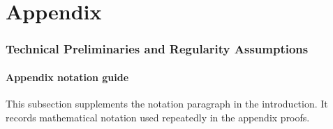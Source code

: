 \documentclass{article}
\theoremstyle{normaltheorem}
\begin{document}
\part{Appendix}
\endgroup
\parttoc

\clearpage

\section{Technical Preliminaries and Regularity Assumptions}\label{append:theory} 

\subsection{Appendix notation guide}\label{append:notation-guide}
This subsection supplements the notation paragraph in the introduction. It records mathematical notation used repeatedly
in the appendix proofs.
\end{document}
